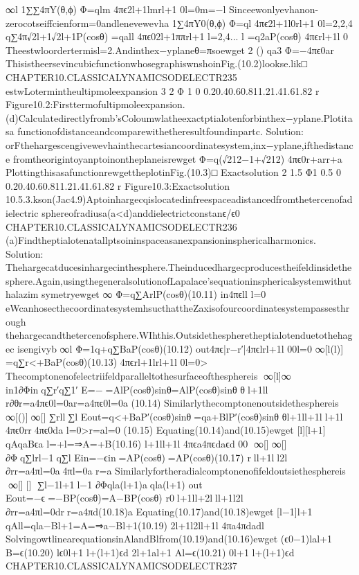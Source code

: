 {{{{{{{{{{{{{{{∞l
1∑∑4πY(θ,ϕ)
Φ=qlm
4πϵ2l+1lmrl+1
0l=0m=−l
Sinceewonlyevhanon-zerocotseiffcienform=0andlenevewevha
1∑4πY0(θ,ϕ)
Φ=ql
4πϵ2l+1l0rl+1
0l=2,2,4
q∑4π√2l+1√2l+1P(cosθ)
=qall
4πϵ02l+1ππrl+1
l=2,4...
l
=q2aP(cosθ)
4πϵrl+1l
0
Theestwloordertermisl=2.Andinthex−yplaneθ=πsoewget
2
()
qa3
Φ=−4πϵ0ar
ThisistheersevincubicfunctionwhosegraphiswnshoinFig.(10.2)lookse.lik□
CHAPTER10.CLASSICALYNAMICSODELECTR235
estwLotermintheultipmoleexpansion
3
2
Φ
1
0
0.20.40.60.811.21.41.61.82
r
Figure10.2:Firsttermofultipmoleexpansion.
(d)Calculatedirectlyfromb’sColoumwlatheexactptialotenforbinthex−yplane.Plotitasa
functionofdistanceandcomparewithetheresultfoundinpartc.
Solution:
orFthehargescengivewevhainthecartesiancoordinatesystem,inx−yplane,ifthedistance
fromtheorigintoyanptoinontheplaneisrewget
Φ=q(√212−1+√212)
4πϵ0r+arr+a
PlottingthisasafunctionrewgettheplotinFig.(10.3)□
Exactsolution
2
1.5
Φ1
0.5
0
0.20.40.60.811.21.41.61.82
r
Figure10.3:Exactsolution
10.5.3.kson(Jac4.9)Aptoinhargecqislocatedinfreespaceadistancedfromthetercenofadielectric
sphereofradiusa(a<d)anddielectrictconstanϵ/ϵ0
CHAPTER10.CLASSICALYNAMICSODELECTR236
(a)Findtheptialotenatallptsoininspaceasanexpansioninsphericalharmonics.
Solution:
Thehargecatducesinhargecinthesphere.Theinducedhargecproducestheifeldinsidethe
sphere.Again,usingthegeneralsolutionofLapalace’sequationinsphericalsystemwithuthalazim
symetryewget
∞
Φ=q∑ArlP(cosθ)(10.11)
in4πϵll
l=0
eWcanhosecthecoordinatesystemhsucthattheZaxisofourcoordinatesystempassesthrough
thehargecandthetercenofsphere.WIhthis.Outsidethespheretheptialotenduetothehagec
isengivyb
∞l
Φ=1q+q∑BaP(cosθ)(10.12)
out4πϵ|r−r′|4πϵlrl+1l
00l=0
∞[l(l)]
=q∑r<+BaP(cosθ)(10.13)
4πϵrl+1lrl+1l
0l=0>
Thecomptonenofelectriifeldparalleltothesurfaceofthesphereis
∞[l]∞
in1∂Φinq∑r′q∑1′
E=−=AlP(cosθ)sinθ=AlP(cosθ)sinθ
θl+1ll
r∂θr=a4πϵ0l=0ar=a4πϵ0l=0a
(10.14)
Similarlythecomptonenoutsidethesphereis
∞[()]∞[]
∑rll∑l
Eout=q<+BaP′(cosθ)sinθ=qa+BlP′(cosθ)sinθ
θl+1ll+1ll+1l
4πϵ0rr4πϵ0da
l=0>r=al=0
(10.15)
Equating(10.14)and(10.15)ewget
[l][l+1]
qAqaBϵa
l=+l=⇒A=+B(10.16)
l+1ll+1l
4πϵa4πϵdaϵd
00
∞[]∞[]
∂Φq∑lrl−1q∑l
Ein=−ϵin=AP(cosθ)=AP(cosθ)(10.17)
rll+1ll2l
∂rr=a4πl=0a4πl=0a
r=a
Similarlyfortheradialcomptonenofifeldoutsiethesphereis
∞[][]
∑l−1l+1l−1
∂Φqla(l+1)aqla(l+1)
out
Eout=−ϵ=−BP(cosθ)=A−BP(cosθ)
r0l+1ll+2lll+1l2l
∂rr=a4πl=0drr=a4πd(10.18)a
Equating(10.17)and(10.18)ewget
[l−1]l+1
qAll=qla−Bl+1=A=⇒a−Bl+1(10.19)
2l+1l2ll+1l
4πa4πdadl
SolvingowtlinearequationsinAlandBlfrom(10.19)and(10.16)ewget
(ϵ0−1)lal+1
B=ϵ(10.20)
lϵ0l+1
l+(l+1)ϵd
2l+1al+1
Al=ϵ(10.21)
0l+1
l+(l+1)ϵd
CHAPTER10.CLASSICALYNAMICSODELECTR237
}}}}}}}}}}}}}}}
